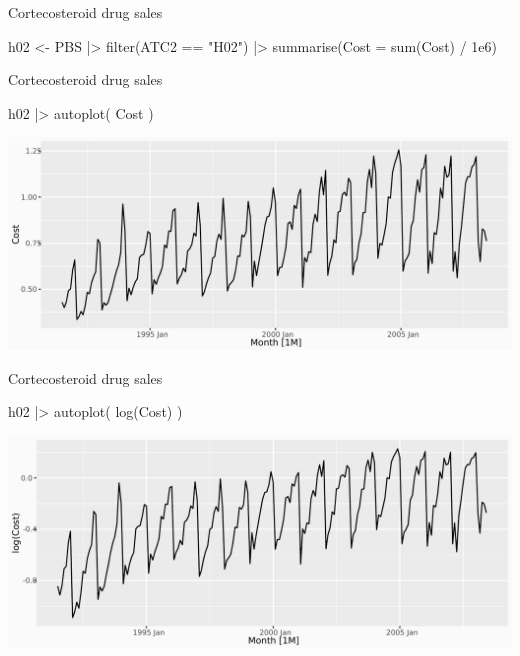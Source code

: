 \documentclass[
  14pt,
  ignorenonframetext,
  aspectratio=169,
]{beamer}
\newenvironment{Shaded}{\begin{snugshade}}{\end{snugshade}}
\newcommand{\AttributeTok}[1]{\textcolor[rgb]{0.77,0.63,0.00}{#1}}
\newcommand{\FloatTok}[1]{\textcolor[rgb]{0.00,0.00,0.81}{#1}}
\newcommand{\FunctionTok}[1]{\textcolor[rgb]{0.00,0.00,0.00}{#1}}
\newcommand{\NormalTok}[1]{\textcolor[rgb]{0.00,0.00,0.00}{#1}}
\newcommand{\OtherTok}[1]{\textcolor[rgb]{0.56,0.35,0.01}{#1}}
\newcommand{\SpecialCharTok}[1]{\textcolor[rgb]{0.00,0.00,0.00}{#1}}
\newcommand{\StringTok}[1]{\textcolor[rgb]{0.31,0.60,0.02}{#1}}
\renewenvironment{Shaded}{\vspace*{0.15cm}\color{black}\fontsize{10}{10}\sf\begin{snugshade}\color{black}}{\end{snugshade}}
\begin{document}
\begin{frame}[fragile]{Cortecosteroid drug sales}
\protect\hypertarget{cortecosteroid-drug-sales}{}
\begin{Shaded}
\begin{Highlighting}[]
\NormalTok{h02 }\OtherTok{\textless{}{-}}\NormalTok{ PBS }\SpecialCharTok{|\textgreater{}}
  \FunctionTok{filter}\NormalTok{(ATC2 }\SpecialCharTok{==} \StringTok{"H02"}\NormalTok{) }\SpecialCharTok{|\textgreater{}}
  \FunctionTok{summarise}\NormalTok{(}\AttributeTok{Cost =} \FunctionTok{sum}\NormalTok{(Cost) }\SpecialCharTok{/} \FloatTok{1e6}\NormalTok{)}
\end{Highlighting}
\end{Shaded}
\end{frame}

\begin{frame}[fragile]{Cortecosteroid drug sales}
\protect\hypertarget{cortecosteroid-drug-sales-1}{}
\begin{Shaded}
\begin{Highlighting}[]
\NormalTok{h02 }\SpecialCharTok{|\textgreater{}} \FunctionTok{autoplot}\NormalTok{(}
\NormalTok{  Cost}
\NormalTok{)}
\end{Highlighting}
\end{Shaded}

\includegraphics{04_arima_files/figure-beamer/unnamed-chunk-5-1.pdf}
\end{frame}

\begin{frame}[fragile]{Cortecosteroid drug sales}
\protect\hypertarget{cortecosteroid-drug-sales-2}{}
\begin{Shaded}
\begin{Highlighting}[]
\NormalTok{h02 }\SpecialCharTok{|\textgreater{}} \FunctionTok{autoplot}\NormalTok{(}
  \FunctionTok{log}\NormalTok{(Cost)}
\NormalTok{)}
\end{Highlighting}
\end{Shaded}

\includegraphics{04_arima_files/figure-beamer/unnamed-chunk-6-1.pdf}
\end{frame}
\end{document}
